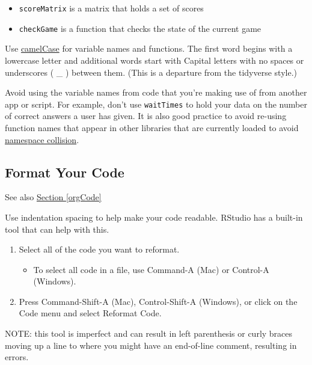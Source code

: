 \documentclass[
]{book}
\providecommand{\tightlist}{%
  \setlength{\itemsep}{0pt}\setlength{\parskip}{0pt}}
\begin{document}
\begin{itemize}
\tightlist
\item
  \texttt{scoreMatrix} is a matrix that holds a set of scores\\
\item
  \texttt{checkGame} is a function that checks the state of the current game
\end{itemize}

Use \href{https://en.wikipedia.org/wiki/Camel_case}{camelCase} for variable names and functions. The first word begins with a lowercase letter and additional words start with Capital letters with no spaces or underscores ( \_ ) between them. (This is a departure from the tidyverse style.)

Avoid using the variable names from code that you're making use of from another app or script. For example, don't use \texttt{waitTimes} to hold your data on the number of correct answers a user has given. It is also good practice to avoid re-using function names that appear in other libraries that are currently loaded to avoid \href{https://en.wikipedia.org/wiki/Naming_collision}{namespace collision}.

\hypertarget{formatCodeb}{%
\subsection{Format Your Code}\label{formatCodeb}}

See also \protect\hyperlink{orgCodeb}{Section \ref{orgCode}}

Use indentation spacing to help make your code readable. RStudio has a built-in tool that can help with this.

\begin{enumerate}
\def\labelenumi{\arabic{enumi}.}
\tightlist
\item
  Select all of the code you want to reformat.

  \begin{itemize}
  \tightlist
  \item
    To select all code in a file, use Command-A (Mac) or Control-A (Windows).
  \end{itemize}
\item
  Press Command-Shift-A (Mac), Control-Shift-A (Windows), or click on the Code menu and select Reformat Code.
\end{enumerate}

NOTE: this tool is imperfect and can result in left parenthesis or curly braces moving up a line to where you might have an end-of-line comment, resulting in errors.
\end{document}
